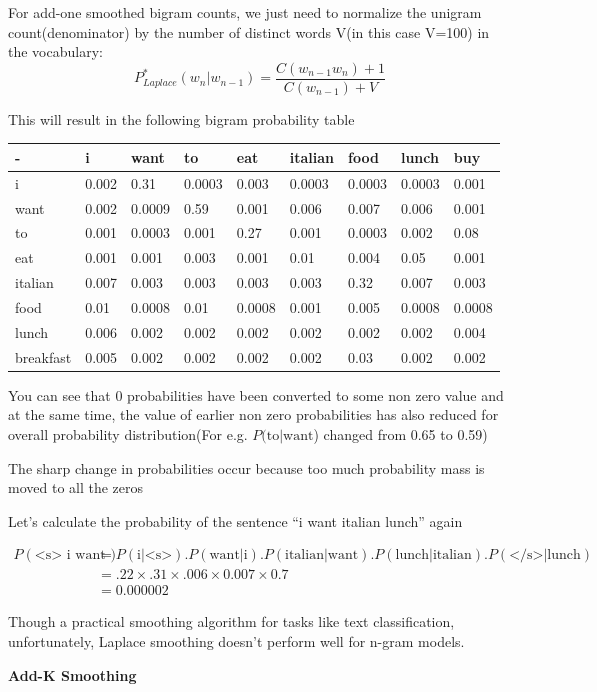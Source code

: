 \documentclass[11pt]{article}
\begin{document}
For add-one smoothed bigram counts, we just need to normalize the
unigram count(denominator) by the number of distinct words V(in this
case V=100) in the vocabulary:
\[ P^*_{Laplace}(w_n|w_{n-1}) = \frac{C(w_{n-1}w_n) + 1}{C(w_{n-1}) + V} \]

This will result in the following bigram probability table

\begin{longtable}[]{@{}lllllllll@{}}
\toprule
- & i & want & to & eat & italian & food & lunch & buy\tabularnewline
\midrule
\endhead
i & 0.002 & 0.31 & 0.0003 & 0.003 & 0.0003 & 0.0003 & 0.0003 &
0.001\tabularnewline
want & 0.002 & 0.0009 & 0.59 & 0.001 & 0.006 & 0.007 & 0.006 &
0.001\tabularnewline
to & 0.001 & 0.0003 & 0.001 & 0.27 & 0.001 & 0.0003 & 0.002 &
0.08\tabularnewline
eat & 0.001 & 0.001 & 0.003 & 0.001 & 0.01 & 0.004 & 0.05 &
0.001\tabularnewline
italian & 0.007 & 0.003 & 0.003 & 0.003 & 0.003 & 0.32 & 0.007 &
0.003\tabularnewline
food & 0.01 & 0.0008 & 0.01 & 0.0008 & 0.001 & 0.005 & 0.0008 &
0.0008\tabularnewline
lunch & 0.006 & 0.002 & 0.002 & 0.002 & 0.002 & 0.002 & 0.002 &
0.004\tabularnewline
breakfast & 0.005 & 0.002 & 0.002 & 0.002 & 0.002 & 0.03 & 0.002 &
0.002\tabularnewline
\bottomrule
\end{longtable}

You can see that 0 probabilities have been converted to some non zero
value and at the same time, the value of earlier non zero probabilities
has also reduced for overall probability distribution(For e.g.
\(P(\text{to|want}\)) changed from 0.65 to 0.59)

The sharp change in probabilities occur because too much probability
mass is moved to all the zeros

Let's calculate the probability of the sentence ``i want italian lunch''
again

\[\begin{align}
P(\text{<s> i want italian lunch </s>})
&= P(\text{i|<s>}).P(\text{want|i}).P(\text{italian|want}).P(\text{lunch|italian}).P(\text{</s>|lunch}) \\
&= .22 \times .31 \times .006 \times 0.007 \times 0.7 \\
&= 0.000002
\end{align}\]

Though a practical smoothing algorithm for tasks like text
classification, unfortunately, Laplace smoothing doesn't perform well
for n-gram models.

\textbf{Add-K Smoothing}
\end{document}
